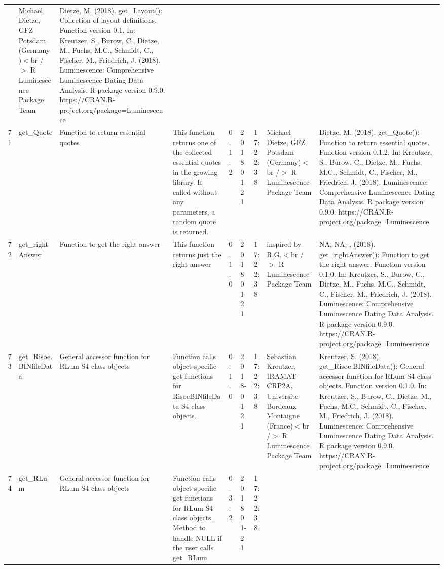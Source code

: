 \begin{table}[ht]
\begin{tabular}{rllllllll}
 & Michael Dietze, GFZ Potsdam (Germany)$<$br /$>$  R Luminescence Package Team & Dietze, M. (2018). get\_Layout(): Collection of layout definitions. Function version 0.1. In: Kreutzer, S., Burow, C., Dietze, M., Fuchs, M.C., Schmidt, C., Fischer, M., Friedrich, J. (2018). Luminescence: Comprehensive Luminescence Dating Data Analysis. R package version 0.9.0. https://CRAN.R-project.org/package=Luminescence
 \\ 
  71 & get\_Quote & Function to return essential quotes & This function returns one of the collected essential quotes in the growing library. If called without any parameters, a random quote is returned. & 0.1.2 & 2018-01-21 & 17:22:38
 & Michael Dietze, GFZ Potsdam (Germany)$<$br /$>$  R Luminescence Package Team & Dietze, M. (2018). get\_Quote(): Function to return essential quotes. Function version 0.1.2. In: Kreutzer, S., Burow, C., Dietze, M., Fuchs, M.C., Schmidt, C., Fischer, M., Friedrich, J. (2018). Luminescence: Comprehensive Luminescence Dating Data Analysis. R package version 0.9.0. https://CRAN.R-project.org/package=Luminescence
 \\ 
  72 & get\_rightAnswer & Function to get the right answer & This function returns just the right answer & 0.1.0 & 2018-01-21 & 17:22:38
 & inspired by R.G.$<$br /$>$  R Luminescence Package Team & NA, NA, ,  (2018). get\_rightAnswer(): Function to get the right answer. Function version 0.1.0. In: Kreutzer, S., Burow, C., Dietze, M., Fuchs, M.C., Schmidt, C., Fischer, M., Friedrich, J. (2018). Luminescence: Comprehensive Luminescence Dating Data Analysis. R package version 0.9.0. https://CRAN.R-project.org/package=Luminescence
 \\ 
  73 & get\_Risoe.BINfileData & General accessor function for RLum S4 class objects & Function calls object-specific get functions for RisoeBINfileData S4 class objects. & 0.1.0 & 2018-01-21 & 17:22:38
 & Sebastian Kreutzer, IRAMAT-CRP2A, Universite Bordeaux Montaigne (France)$<$br /$>$  R Luminescence Package Team & Kreutzer, S. (2018). get\_Risoe.BINfileData(): General accessor function for RLum S4 class objects. Function version 0.1.0. In: Kreutzer, S., Burow, C., Dietze, M., Fuchs, M.C., Schmidt, C., Fischer, M., Friedrich, J. (2018). Luminescence: Comprehensive Luminescence Dating Data Analysis. R package version 0.9.0. https://CRAN.R-project.org/package=Luminescence
 \\ 
  74 & get\_RLum & General accessor function for RLum S4 class objects & Function calls object-specific get functions for RLum S4 class objects.  Method to handle NULL if the user calls get\_RLum & 0.3.2 & 2018-01-21 & 17:22:38

\end{tabular}
\end{table}

